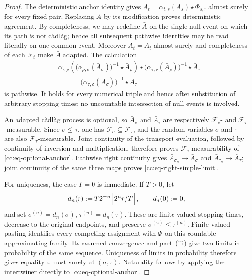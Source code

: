 \documentclass[10pt,reqno]{amsart}
\theoremstyle{plain}
\theoremstyle{definition}
\theoremstyle{remark}
\begin{document}
\begin{proof}
The deterministic anchor identity gives
\(A_t=\alpha_{t,s}(A_s)\star\Phi_{s,t}\) almost surely for every fixed
pair.  Replacing \(A\) by its modification proves deterministic agreement.
By completeness, we may redefine \(\bar A\) on the single null event on
which its path is not càdlàg; hence all subsequent pathwise identities may
be read literally on one common event.  Moreover
\(\bar A_t=A_t\) almost surely and completeness of each \({\mathcal F}_t\) make
\(\bar A\) adapted.
The calculation
\begin{align*}
 &\alpha_{\tau,\rho}\!\left(
  \bigl(\alpha_{\rho,\sigma}(\bar A_\sigma)\bigr)^{-1}
  \star\bar A_\rho\right)
  \star
  \bigl(\alpha_{\tau,\rho}(\bar A_\rho)\bigr)^{-1}
  \star\bar A_\tau\\
 &\qquad=
 \bigl(\alpha_{\tau,\sigma}(\bar A_\sigma)\bigr)^{-1}
 \star\bar A_\tau
\end{align*}
is pathwise.  It holds for every numerical triple and hence after
substitution of arbitrary stopping times; no uncountable intersection of
null events is involved.

An adapted càdlàg process is optional, so \(\bar A_\sigma\) and
\(\bar A_\tau\) are respectively \({\mathcal F}_\sigma\)- and
\({\mathcal F}_\tau\)-measurable.  Since \(\sigma\le\tau\), one has
\({\mathcal F}_\sigma\subseteq{\mathcal F}_\tau\), and the random variables \(\sigma\) and
\(\tau\) are also \({\mathcal F}_\tau\)-measurable.  Joint continuity of the
transport evaluation, followed by continuity of inversion and
multiplication, therefore proves \({\mathcal F}_\tau\)-measurability of
\eqref{cc:eq-optional-anchor}.  Pathwise right continuity gives
\(\bar A_{\sigma_n}\to\bar A_\sigma\) and
\(\bar A_{\tau_n}\to\bar A_\tau\); joint continuity of the same three maps
proves \eqref{cc:eq-right-simple-limit}.

For uniqueness, the case \(T=0\) is immediate.  If \(T>0\), let
\[
 d_n(r):=T2^{-n}\Bigl\lceil 2^n r/T\Bigr\rceil,
 \qquad d_n(0):=0,
\]
and set \(\sigma^{(n)}=d_n(\sigma)\),
\(\tau^{(n)}=d_n(\tau)\).  These are finite-valued stopping times,
decrease to the original endpoints, and preserve
\(\sigma^{(n)}\le\tau^{(n)}\).  Finite-valued pasting identifies every
competing assignment with \(\bar\Phi\) on this countable approximating
family.  Its assumed convergence and part~\textup{(iii)} give two limits
in probability of the same sequence.  Uniqueness of limits in probability
therefore gives equality almost surely at \((\sigma,\tau)\).  Naturality
follows by applying the intertwiner directly to
\eqref{cc:eq-optional-anchor}.
\end{proof}
\end{document}
